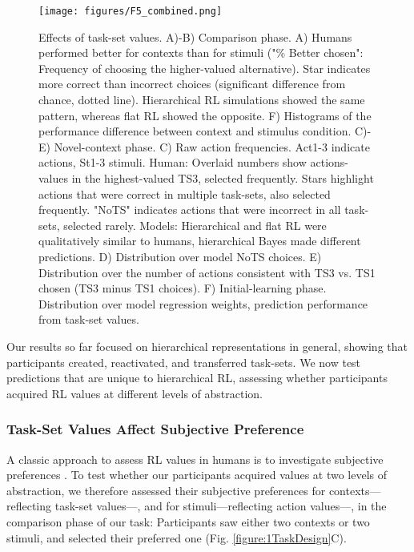 \documentclass[10pt,letterpaper]{article}  %
\begin{document}
\begin{figure}%
    \begin{center}
	\texttt{[image: figures/F5\_combined.png]}
    \end{center}
    \caption{Effects of task-set values. A)-B) Comparison phase. A) Humans performed better for contexts than for stimuli ("\% Better chosen": Frequency of choosing the higher-valued alternative). Star indicates more correct than incorrect choices (significant difference from chance, dotted line). Hierarchical RL simulations showed the same pattern, whereas flat RL showed the opposite. F) Histograms of the performance difference between context and stimulus condition. C)-E) Novel-context phase. C) Raw action frequencies. Act1-3 indicate actions, St1-3 stimuli. Human: Overlaid numbers show actions-values in the highest-valued TS3, selected frequently. Stars highlight actions that were correct in multiple task-sets, also selected frequently. "NoTS" indicates actions that were incorrect in all task-sets, selected rarely. Models: Hierarchical and flat RL were qualitatively similar to humans, hierarchical Bayes made different predictions. D) Distribution over model NoTS choices. E) Distribution over the number of actions consistent with TS3 vs. TS1 chosen (TS3 minus TS1 choices). F) Initial-learning phase. Distribution over model regression weights, prediction performance from task-set values.}
    \label{figure:F5_combined}
\end{figure}

Our results so far focused on hierarchical representations in general, showing that participants created, reactivated, and transferred task-sets. %
We now test predictions that are unique to hierarchical RL, assessing whether participants acquired RL values at different levels of abstraction.

\subsubsection*{Task-Set Values Affect Subjective Preference}

A classic approach to assess RL values in humans is to investigate subjective preferences \cite{jocham_dopamine-mediated_2011}.
To test whether our participants acquired values at two levels of abstraction, we therefore assessed their subjective preferences for contexts---reflecting task-set values---, and for stimuli---reflecting action values---, in the comparison phase of our task: Participants saw either two contexts or two stimuli, and selected their preferred one (Fig. \ref{figure:1TaskDesign}C).
\end{document}
